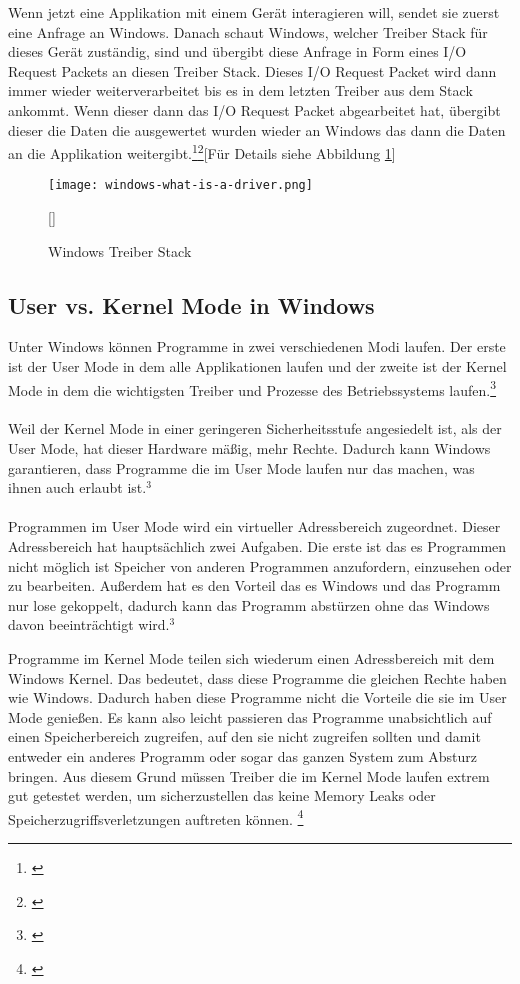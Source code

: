 \newpage
\noindent
Wenn jetzt eine Applikation mit einem Gerät interagieren will, sendet sie zuerst eine Anfrage an Windows. Danach schaut Windows, welcher Treiber Stack für dieses Gerät zuständig, sind und übergibt diese Anfrage in Form eines I/O Request Packets an diesen Treiber Stack. Dieses I/O Request Packet wird dann immer wieder weiterverarbeitet bis es in dem letzten Treiber aus dem Stack ankommt. Wenn dieser dann das I/O Request Packet abgearbeitet hat, übergibt dieser die Daten die ausgewertet wurden wieder an Windows das dann die Daten an die Applikation weitergibt.\footnote[1]{\cite[Vgl.][]{19}}\footnote[2]{\cite[Vgl.][]{20}}[Für Details siehe Abbildung \ref{windows-driver-stack}]
\begin{figure}[H]
    \centering
    \texttt{[image: windows-what-is-a-driver.png]}
    \caption[Windows Treiber Stack]{Windows Treiber Stack}[\cite{20}]
    \label{windows-driver-stack} 
\end{figure}
\noindent
\subsection{User vs. Kernel Mode in Windows}
Unter Windows können Programme in zwei verschiedenen Modi laufen. Der erste ist der User Mode in dem alle Applikationen laufen und der zweite ist der Kernel Mode in dem die wichtigsten Treiber und Prozesse des Betriebssystems laufen.\footnote[3]{\cite[Vgl.][]{21}}
\\\\
Weil der Kernel Mode in einer geringeren Sicherheitsstufe angesiedelt ist, als der User Mode, hat dieser Hardware mäßig, mehr Rechte. Dadurch kann Windows garantieren, dass Programme die im User Mode laufen nur das machen, was ihnen auch erlaubt ist.$^{3}$
\\\\
Programmen im User Mode wird ein virtueller Adressbereich zugeordnet. Dieser Adressbereich hat hauptsächlich zwei Aufgaben. Die erste ist das es Programmen nicht möglich ist Speicher von anderen Programmen anzufordern, einzusehen oder zu bearbeiten. Außerdem hat es den Vorteil das es Windows und das Programm nur lose gekoppelt, dadurch kann das Programm abstürzen ohne das Windows davon beeinträchtigt wird.$^{3}$

\newpage
\noindent
Programme im Kernel Mode teilen sich wiederum einen Adressbereich mit dem Windows Kernel. Das bedeutet, dass diese Programme die gleichen Rechte haben wie Windows. Dadurch haben diese Programme nicht die Vorteile die sie im User Mode genießen. Es kann also leicht passieren das Programme unabsichtlich auf einen Speicherbereich zugreifen, auf den sie nicht zugreifen sollten und damit entweder ein anderes Programm oder sogar das ganzen System zum Absturz bringen. Aus diesem Grund müssen Treiber die im Kernel Mode laufen extrem gut getestet werden, um sicherzustellen das keine Memory Leaks oder Speicherzugriffsverletzungen auftreten können. \footnote[1]{\cite[Vgl.][]{21}}

